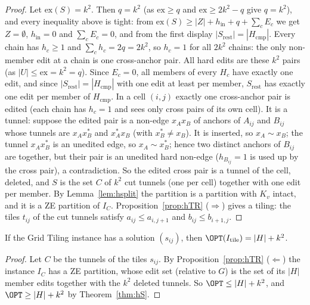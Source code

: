\begin{proof}
Let $\mathrm{ex}(S)=k^2$. Then $q=k^2$ (as $\mathrm{ex}\ge q$ and $\mathrm{ex}\ge2k^2-q$ give $q=k^2$), and every inequality above is tight: from $\mathrm{ex}(S)\ge|Z|+h_{\mathrm{in}}+q+\sum_cE_c$ we get $Z=\emptyset$, $h_{\mathrm{in}}=0$ and $\sum_cE_c=0$, and from the first display $|S_{\mathrm{rest}}|=|H_{\mathrm{cmp}}|$. Every chain has $h_c\ge1$ and $\sum_ch_c=2q=2k^2$, so $h_c=1$ for all $2k^2$ chains: the only non-member edit at a chain is one cross-anchor pair. All hard edits are these $k^2$ pairs (as $|U|\le\mathrm{ex}=k^2=q$). Since $E_c=0$, all members of every $H_c$ have exactly one edit, and since $|S_{\mathrm{rest}}|=|H_{\mathrm{cmp}}|$ with one edit at least per member, $S_{\mathrm{rest}}$ has exactly one edit per member of $H_{\mathrm{cmp}}$. In a cell $(i,j)$ exactly one cross-anchor pair is edited (each chain has $h_c=1$ and sees only cross pairs of its own cell). It is a tunnel: suppose the edited pair is a non-edge $x_Ax_B$ of anchors of $A_{ij}$ and $B_{ij}$ whose tunnels are $x_Ax_B^{*}$ and $x_A^{*}x_B$ (with $x_B^*\ne x_B$). It is inserted, so $x_A\sim x_B$; the tunnel $x_Ax_B^*$ is an unedited edge, so $x_A\sim x_B^*$; hence two distinct anchors of $B_{ij}$ are together, but their pair is an unedited hard non-edge ($h_{B_{ij}}=1$ is used up by the cross pair), a contradiction. So the edited cross pair is a tunnel of the cell, deleted, and $S$ is the set $C$ of $k^2$ cut tunnels (one per cell) together with one edit per member. By Lemma~\ref{lem:hsplit} the partition is a partition with $K_v$ intact, and it is a ZE partition of $I_C$. Proposition~\ref{prop:hTR} ($\Rightarrow$) gives a tiling: the tiles $t_{ij}$ of the cut tunnels satisfy $a_{ij}\le a_{i,j+1}$ and $b_{ij}\le b_{i+1,j}$.
\end{proof}

\begin{theorem}[Completeness]\label{thm:hC}
If the Grid Tiling instance has a solution $(s_{ij})$, then $\OPT(I_{\mathrm{tile}})=|H|+k^2$.
\end{theorem}
\begin{proof}
Let $C$ be the tunnels of the tiles $s_{ij}$. By Proposition~\ref{prop:hTR} ($\Leftarrow$) the instance $I_C$ has a ZE partition, whose edit set (relative to $G$) is the set of its $|H|$ member edits together with the $k^2$ deleted tunnels. So $\OPT\le|H|+k^2$, and $\OPT\ge|H|+k^2$ by Theorem~\ref{thm:hS}.
\end{proof}

